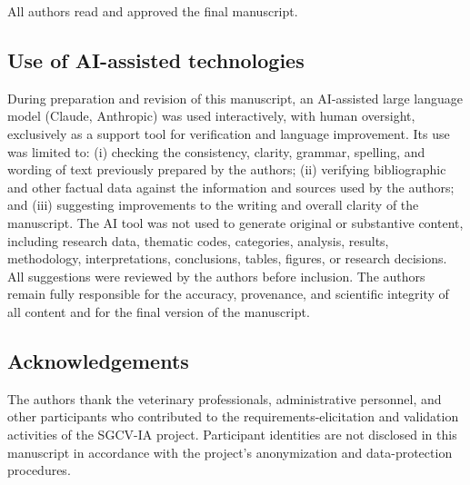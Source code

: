 \documentclass[12pt]{article}
\begin{document}
All authors read and approved the final manuscript.


\subsection*{Use of AI-assisted technologies}

During preparation and revision of this manuscript, an AI-assisted
large language model (Claude, Anthropic) was used interactively,
with human oversight, exclusively as a support tool for verification
and language improvement. Its use was limited to: (i) checking the
consistency, clarity, grammar, spelling, and wording of text previously
prepared by the authors; (ii) verifying bibliographic and other factual
data against the information and sources used by the authors; and
(iii) suggesting improvements to the writing and overall clarity of
the manuscript. The AI tool was not used to generate original or
substantive content, including research data, thematic codes,
categories, analysis, results, methodology, interpretations,
conclusions, tables, figures, or research decisions. All suggestions
were reviewed by the authors before inclusion. The authors remain
fully responsible for the accuracy, provenance, and scientific
integrity of all content and for the final version of the manuscript.


\subsection*{Acknowledgements}

The authors thank the veterinary professionals, administrative
personnel, and other participants who contributed to the
requirements-elicitation and validation activities of the SGCV-IA
project. Participant identities are not disclosed in this manuscript
in accordance with the project's anonymization and data-protection
procedures.
\end{document}

